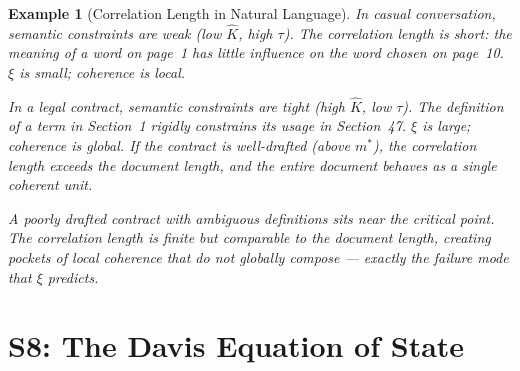 \documentclass[11pt,letterpaper]{article}
\newtheorem{example}[conjecture]{Example}
\newcommand{\Khat}{\hat{K}}
\begin{document}
\begin{example}[Correlation Length in Natural Language]
In casual conversation, semantic constraints are weak (low $\Khat$, high 
$\tau$). The correlation length is short: the meaning of a word on page~1 
has little influence on the word chosen on page~10. $\xi$ is small; 
coherence is local.

In a legal contract, semantic constraints are tight (high $\Khat$, low 
$\tau$). The definition of a term in Section~1 rigidly constrains its usage 
in Section~47. $\xi$ is large; coherence is global. If the contract is 
well-drafted (above $m^*$), the correlation length exceeds the document 
length, and the entire document behaves as a single coherent unit.

A poorly drafted contract with ambiguous definitions sits near the critical 
point. The correlation length is finite but comparable to the document 
length, creating pockets of local coherence that do not globally compose 
--- exactly the failure mode that $\xi$ predicts.
\end{example}

\newpage
\section{S8: The Davis Equation of State}
\end{document}
